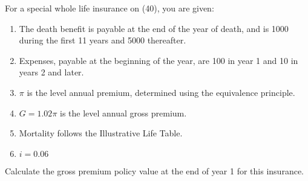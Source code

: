For a special whole life insurance on (40), you are given:
\begin{enumerate}
\item The death benefit is payable at the end of the year of death, and is 1000 during the first 11 years and 5000 thereafter.
\item Expenses, payable at the beginning of the year, are 100 in year 1 and 10 in years 2 and later.
\item $\pi$ is the level annual premium, determined using the equivalence principle.
\item $G = 1.02 \pi$ is the level annual gross premium.
\item Mortality follows the Illustrative Life Table.
\item $i = 0.06$
\end{enumerate}
Calculate the gross premium policy value at the end of year 1 for this insurance.

